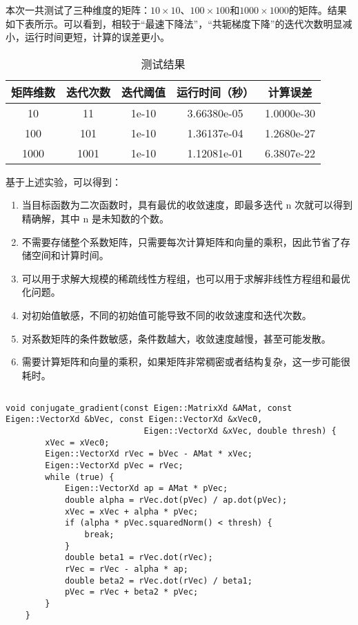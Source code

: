 \documentclass[12pt, onecolumn]{article}
\newcommand\normf{\fangsong}
\begin{document}
		本次一共测试了三种维度的矩阵：$10\times 10$、$100\times 100$和$1000\times 1000$的矩阵。结果如下表所示。可以看到，相较于“最速下降法”，“共轭梯度下降”的迭代次数明显减小，运行时间更短，计算的误差更小。
		\begin{table}[h]
		\normf
			\centering
			\caption{\normf 测试结果}
			\vspace{2mm}
		\begin{tabular}{c|cccc}
		\hline
		矩阵维数 & 迭代次数 & 迭代阈值  & 运行时间（秒）     & 计算误差       \\ \hline
		10   & 11   & 1e-10 & 3.66380e-05 & 1.0000e-30 \\
		100  & 101  & 1e-10 & 1.36137e-04 & 1.2680e-27 \\
		1000 & 1001 & 1e-10 & 1.12081e-01 & 6.3807e-22 \\ \hline
		\end{tabular}
		\end{table}
		
		基于上述实验，可以得到：
		\begin{enumerate}
		\item 当目标函数为二次函数时，具有最优的收敛速度，即最多迭代 n 次就可以得到精确解，其中 n 是未知数的个数。
		
		\item 不需要存储整个系数矩阵，只需要每次计算矩阵和向量的乘积，因此节省了存储空间和计算时间。
		
		\item 可以用于求解大规模的稀疏线性方程组，也可以用于求解非线性方程组和最优化问题。
		
		\item 对初始值敏感，不同的初始值可能导致不同的收敛速度和迭代次数。
		
		\item 对系数矩阵的条件数敏感，条件数越大，收敛速度越慢，甚至可能发散。
		
		\item 需要计算矩阵和向量的乘积，如果矩阵非常稠密或者结构复杂，这一步可能很耗时。
		\end{enumerate}
		
	\subsection{\normf{关键代码}}
	\begin{lstlisting}[caption=\normf{共轭梯度下降法}]
    void conjugate_gradient(const Eigen::MatrixXd &AMat, const Eigen::VectorXd &bVec, const Eigen::VectorXd &xVec0,
                            Eigen::VectorXd &xVec, double thresh) {
        xVec = xVec0;
        Eigen::VectorXd rVec = bVec - AMat * xVec;
        Eigen::VectorXd pVec = rVec;
        while (true) {
            Eigen::VectorXd ap = AMat * pVec;
            double alpha = rVec.dot(pVec) / ap.dot(pVec);
            xVec = xVec + alpha * pVec;
            if (alpha * pVec.squaredNorm() < thresh) {
                break;
            }
            double beta1 = rVec.dot(rVec);
            rVec = rVec - alpha * ap;
            double beta2 = rVec.dot(rVec) / beta1;
            pVec = rVec + beta2 * pVec;
        }
    }
	\end{lstlisting}
		
\end{document}

